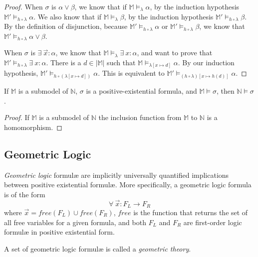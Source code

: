 \begin{proof}
			When $\sigma$ is $\alpha \vee \beta$, we know that if $\mathbb{M}
			\models_\lambda \alpha$, by the induction hypothesis $\mathbb{M}'
			\models_{h\circ\lambda} \alpha$. We also know that if $\mathbb{M}
			\models_\lambda \beta$, by the induction hypothesis $\mathbb{M}'
			\models_{h\circ\lambda} \beta$. By the definition of disjunction,
			because $\mathbb{M}' \models_{h\circ\lambda} \alpha$ or
			$\mathbb{M}' \models_{h\circ\lambda} \beta$, we know that
			$\mathbb{M}' \models_{h\circ\lambda} \alpha \vee \beta$.

			When $\sigma$ is $\exists\ \vec x : \alpha$, we know that
			$\mathbb{M} \models_\lambda \exists\ x : \alpha$, and want to prove
			that $\mathbb{M}' \models_{h\circ\lambda} \exists\ x : \alpha$.
			There is a $d \in |\mathbb{M}|$ such that $\mathbb{M}
			\models_{\lambda[x\mapsto d]} \alpha$. By our induction
			hypothesis, $\mathbb{M}' \models_{h\circ(\lambda[x\mapsto d])}
			\alpha$. This is equivalent to $\mathbb{M}'
			\models_{(h\circ\lambda)[x\mapsto h(d)]} \alpha$.
		\end{proof}

		\begin{corollary}
			If $\mathbb{M}$ is a submodel of $\mathbb{N}$, $\sigma$ is a
			positive-existential formula, and $\mathbb{M} \models \sigma$, then
			$\mathbb{N} \models \sigma$.
		\end{corollary}

		\begin{proof}
			If $\mathbb{M}$ is a submodel of $\mathbb{N}$ the inclusion
			function from $\mathbb{M}$ to $\mathbb{N}$ is a homomorphism.
		\end{proof}

	\subsection{Geometric Logic}
	\label{sec:technical_background.geometric_logic}

		\emph{Geometric logic} formul{\ae} are implicitly universally
		quantified implications between positive existential formul{\ae}. More
		specifically, a geometric logic formula is of the form
			\[
			\forall\ \vec{x} : F_L \to F_R
			\]
		where $\vec{x} = free(F_L) \cup free(F_R)$, $free$ is the function that
		returns the set of all free variables for a given formula, and both
		$F_L$ and $F_R$ are first-order logic formul{\ae} in positive
		existential form.

		A set of geometric logic formul{\ae} is called a \emph{geometric
		theory}.


